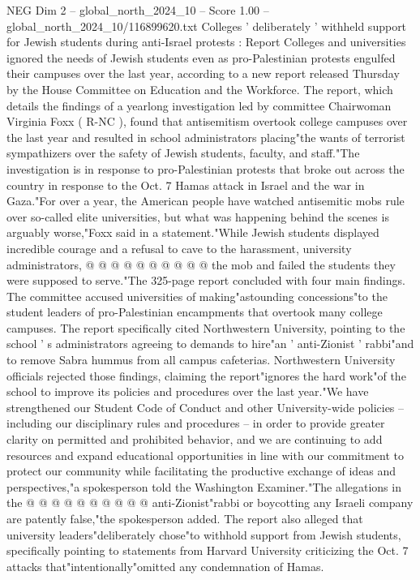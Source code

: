 \begin{textsample}{NEG Dim 2 – global\_north\_2024\_10 – Score 1.00 – global\_north\_2024\_10/116899620.txt}  \label{ex:f2_neg_368}
Colleges ' deliberately ' withheld support for Jewish students during anti-Israel protests : Report Colleges and universities ignored the needs of Jewish students even as pro-Palestinian protests engulfed their campuses over the last year, according to a new report released Thursday by the House Committee on Education and the Workforce.
The report, which details the findings of a yearlong investigation led by committee Chairwoman Virginia Foxx ( R-NC ), found that antisemitism overtook college campuses over the last year and resulted in school administrators placing"the wants of terrorist sympathizers over the safety of Jewish students, faculty, and staff."The investigation is in response to pro-Palestinian protests that broke out across the country in response to the Oct. 7 Hamas attack in Israel and the war in Gaza."For over a year, the American people have watched antisemitic mobs rule over so-called elite universities, but what was happening behind the scenes is arguably worse,"Foxx said in a statement."While Jewish students displayed incredible courage and a refusal to cave to the harassment, university administrators, @ @ @ @ @ @ @ @ @ @ the mob and failed the students they were supposed to serve."The 325-page report concluded with four main findings.
The committee accused universities of making"astounding concessions"to the student leaders of pro-Palestinian encampments that overtook many college campuses.
The report specifically cited Northwestern University, pointing to the school ' s administrators agreeing to demands to hire"an ' anti-Zionist ' rabbi"and to remove Sabra hummus from all campus cafeterias.
Northwestern University officials rejected those findings, claiming the report"ignores the hard work"of the school to improve its policies and procedures over the last year."We have strengthened our Student Code of Conduct and other University-wide policies -- including our disciplinary rules and procedures -- in order to provide greater clarity on permitted and prohibited behavior, and we are continuing to add resources and expand educational opportunities in line with our commitment to protect our community while facilitating the productive exchange of ideas and perspectives,"a spokesperson told the Washington Examiner."The allegations in the @ @ @ @ @ @ @ @ @ @ anti-Zionist"rabbi or boycotting any Israeli company are patently false,"the spokesperson added.
The report also alleged that university leaders"deliberately chose"to withhold support from Jewish students, specifically pointing to statements from Harvard University criticizing the Oct. 7 attacks that"intentionally"omitted any condemnation of Hamas.

\end{textsample}
